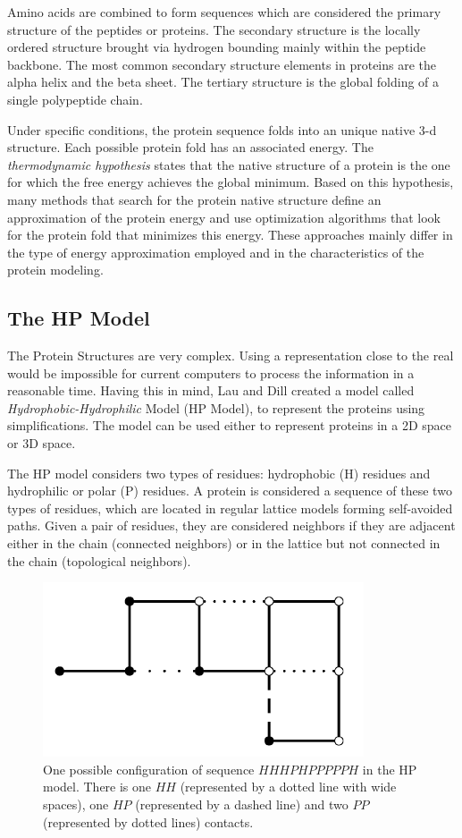 Amino acids are combined to form sequences which are considered the primary structure of the peptides or proteins. The secondary structure is the locally ordered structure brought via hydrogen bounding mainly within the peptide backbone. The most common secondary structure elements in proteins are the alpha helix and the beta sheet. The tertiary structure is the global folding of a single polypeptide chain.


Under specific conditions, the protein sequence folds into an unique native 3-d structure. Each possible protein fold has an associated energy. The \emph{thermodynamic hypothesis} states that the native structure of a protein is the one for which the free energy achieves the global minimum. Based on this hypothesis, many methods that search for the protein native structure define an approximation of the protein energy and use optimization algorithms that look for the protein fold that minimizes this energy. These approaches mainly differ in the type of energy approximation employed and in the characteristics of the protein modeling.

\subsection{The HP Model} \label{sec:hpModel}


The Protein Structures are very complex. Using a representation close to the real would be impossible for current computers to process the information in a reasonable time. Having this in mind, Lau and Dill \cite{lau1989lattice} created a model called \textit{Hydrophobic-Hydrophilic} Model (HP Model), to represent the proteins using simplifications. The model can be used either to represent proteins in a 2D space or 3D space.


The HP model considers two types of residues:  hydrophobic (H) residues  and hydrophilic or polar (P) residues. A protein is considered a sequence of these two types of residues, which are located in regular lattice models forming self-avoided paths. Given a pair of residues, they are considered neighbors if they are adjacent  either in the chain (connected neighbors) or  in the lattice but not connected in the chain (topological neighbors).


\begin{figure}[htb!] \label{fig:PROTEXAM}
	\centering
	\includegraphics[scale=0.7]{figures/protein_example.png}
	\caption{One possible configuration of  sequence $HHHPHPPPPPH$ in the HP model. There is one $HH$ (represented by a dotted line with wide spaces), one $HP$ (represented by a dashed line) and  two $PP$  (represented by dotted lines) contacts.}
\end{figure}


